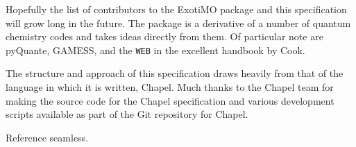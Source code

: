 \label{Acknowledgments}

Hopefully the list of contributors to the ExotiMO package and
this specification will grow long in
the future. The package is a derivative of a number of quantum chemistry codes
and takes ideas directly from them. Of particular note are pyQuante,\cite{pyquante} 
GAMESS,\cite{gamess19may2004} and the \lstinline{WEB} in the excellent handbook by 
Cook.\cite{cook}

The structure and approach of this specification draws heavily from that of the 
language in which it is written, Chapel.\cite{chapel-specification} Much thanks to the Chapel team
for making the source code for the Chapel specification and various development scripts 
available as part of the Git repository for Chapel.\cite{chapel-repository} 

\begin{TODO}
  Reference seamless.
\end{TODO}
